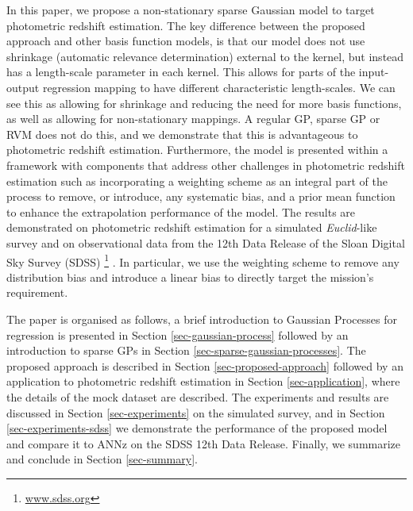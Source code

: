 \documentclass[useAMS,usenatbib,fleqn]{mn2e}
\begin{document}
In this paper, we propose a non-stationary sparse Gaussian model to target photometric redshift estimation. The key difference between the proposed approach and other basis function models, is that our model does not use shrinkage (automatic relevance determination) external to the kernel, but instead has a length-scale parameter in each kernel. This allows for parts of the input-output regression mapping to have different characteristic length-scales. We can see this as allowing for shrinkage and reducing the need for more basis functions, as well as allowing for non-stationary mappings. A regular GP, sparse GP or RVM does not do this, and we demonstrate that this is advantageous to photometric redshift estimation. Furthermore, the model is presented within a framework with components that address other challenges in photometric redshift estimation such as incorporating a weighting scheme as an integral part of the process to remove, or introduce, any systematic bias, and a prior mean function to enhance the extrapolation performance of the model. The results are demonstrated on photometric redshift estimation for a simulated {\em Euclid}-like survey \citep{laureijs2011} and on observational data from the 12th Data Release of the Sloan Digital Sky Survey (SDSS) \citep{SDSS3}\footnote{\url{www.sdss.org}} . In particular, we use the weighting scheme to remove any distribution bias and introduce a linear bias to directly target the mission's requirement. 

The paper is organised as follows, a brief introduction to Gaussian Processes for regression is presented in Section \ref{sec-gaussian-process} followed by an introduction to sparse GPs in Section \ref{sec-sparse-gaussian-processes}. The proposed approach is described in Section \ref{sec-proposed-approach} followed by an application to photometric redshift estimation in Section \ref{sec-application}, where the details of the mock dataset are described. The experiments and results are discussed in Section \ref{sec-experiments} on the simulated survey, and in Section \ref{sec-experiments-sdss} we demonstrate the performance of the proposed model and compare it to ANNz on the SDSS 12th Data Release. Finally, we summarize and conclude in Section \ref{sec-summary}.
\end{document}
